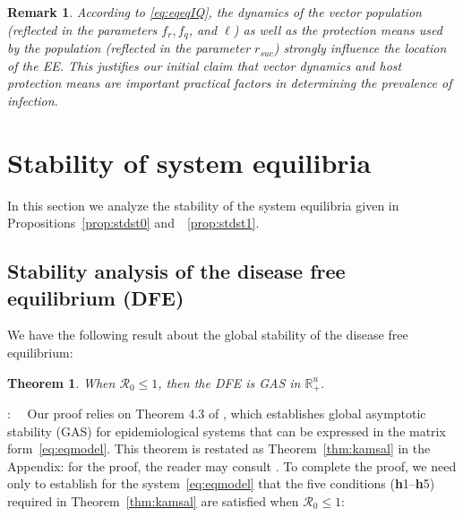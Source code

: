 \documentclass[a4paper]{article}
\newcommand{\varpiVar}{r_{suc}}
\newtheorem{prop}{Proposition}[section]
\newtheorem{thm}{Theorem}[section]
\newtheorem{rmq}{Remark}[section]
\begin{document}
\begin{rmq}\em \label{rmk.rplctm} According to \eqref{eq:eqeqIQ},  the dynamics of the vector population (reflected in the parameters $f_r, f_q$, and $\ell$) as well as the protection means used by the population (reflected in the parameter $\varpiVar $) 
strongly influence the location of the EE. This justifies our initial claim that vector dynamics and host protection means are important practical factors in determining the prevalence of infection.
\end{rmq}
%

\section{Stability of system equilibria}\label{sec.analysis}
In this section we analyze the stability of the system equilibria given in Propositions~\ref{prop:stdst0} and~~\ref{prop:stdst1}.

\subsection{Stability analysis of the disease free equilibrium (DFE)}\label{subsec.dfestabanan}
\noindent We have the following result about the global stability of the disease free equilibrium:
\begin{thm} \label{thm.defstab} When $\mathcal R_0 \leqslant 1$, then the DFE is GAS  in $\mathbb R_+^u$.
\end{thm}

:~~
Our proof relies on Theorem 4.3 of \cite{KamSal07}, which establishes global asymptotic stability (GAS) for epidemiological systems that can be expressed in the matrix form~\eqref{eq:eqmodel}. This theorem is restated as Theorem~\ref{thm:kamsal} in the Appendix: for the proof, the reader may consult \cite{KamSal07}. To complete the proof, we need only to establish for the system~\eqref{eq:eqmodel} that the five conditions ({\bf h}1--{\bf h}5) required in Theorem~\ref{thm:kamsal} are satisfied when $\mathcal R_0\leqslant 1$:
  
\end{document}

